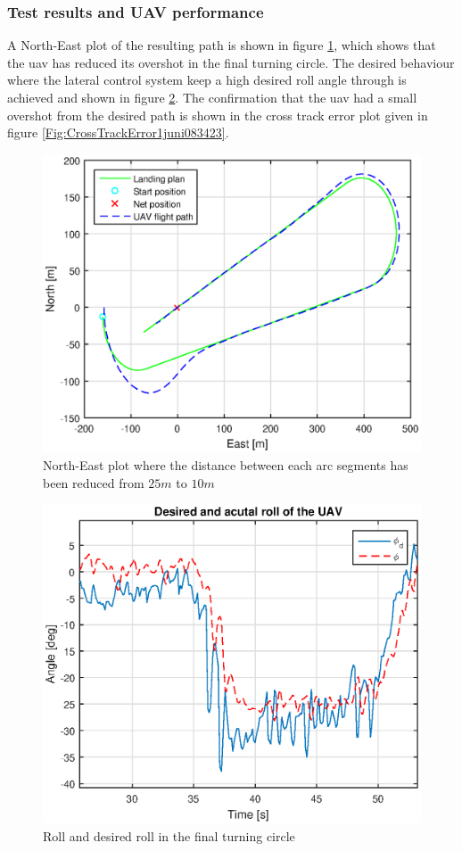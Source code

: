 \subsubsection{Test results and UAV performance}
A North-East plot of the resulting path is shown in figure \ref{Fig:NorthEast1juni083423}, which shows that the \gls{uav} has reduced its overshot in the final turning circle. The desired behaviour where the lateral control system keep a high desired roll angle through is achieved and shown in figure \ref{Fig:RollFinalTurning083423}. The confirmation that the \gls{uav} had a small overshot from the desired path is shown in the cross track error plot given in figure \ref{Fig:CrossTrackError1juni083423}.
\begin{figure}[H]
\centering
\includegraphics[scale=0.7]{figs/Experiment/NorthEast1juni083423.eps}
\caption{North-East plot where the distance between each arc segments has been reduced from $25 m$ to $10 m$}
\label{Fig:NorthEast1juni083423}
\end{figure}
\begin{figure}
\centering
\includegraphics[scale=0.7]{figs/Experiment/Roll1juni083423.eps}
\caption{Roll and desired roll in the final turning circle}
\label{Fig:RollFinalTurning083423}
\end{figure}
